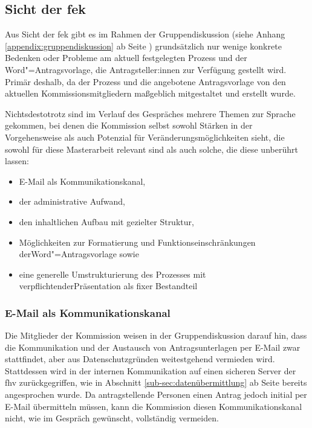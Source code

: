 \documentclass[a4paper,12pt,twoside,numbers=noendperiod]{scrreprt}
\begin{document}
\subsection{Sicht der \acl{fek}}
\label{sub-sec:probleme-sicht-fek}

Aus Sicht der \acl{fek} gibt es im Rahmen der Gruppendiskussion (siehe Anhang \ref{appendix:gruppendiskussion} ab Seite \pageref{appendix:gruppendiskussion}) grundsätzlich nur wenige konkrete Bedenken oder Probleme am aktuell festgelegten Prozess und der Word"=Antragsvorlage, die Antragsteller:innen zur Verfügung gestellt wird. Primär deshalb, da der Prozess und die angebotene Antragsvorlage von den aktuellen Kommissionsmitgliedern maßgeblich mitgestaltet und erstellt wurde.

Nichtsdestotrotz sind im Verlauf des Gespräches mehrere Themen zur Sprache gekommen, bei denen die Kommission selbst sowohl Stärken in der Vorgehensweise als auch Potenzial für Veränderungsmöglichkeiten sieht, die sowohl für diese Masterarbeit relevant sind als auch solche, die diese unberührt lassen:
\begin{itemize}
    \item E-Mail als Kommunikationskanal,
    \item der administrative Aufwand,
    \item den inhaltlichen Aufbau mit gezielter Struktur,
    \item Möglichkeiten zur Formatierung und Funktionseinschränkungen der\newline Word"=Antragsvorlage sowie
    \item eine generelle Umstrukturierung des Prozesses mit verpflichtender\newline Präsentation als fixer Bestandteil
\end{itemize}

\subsubsection*{E-Mail als Kommunikationskanal}
\label{sub-sub-sec:email-kommunikationskanal}

Die Mitglieder der Kommission weisen in der Gruppendiskussion darauf hin, dass die Kommunikation und der Austausch von Antragsunterlagen per E-Mail zwar stattfindet, aber aus Datenschutzgründen weitestgehend vermieden wird. Stattdessen wird in der internen Kommunikation auf einen sicheren Server der \acl{fhv} zurückgegriffen, wie in Abschnitt \ref{sub-sec:datenübermittlung} ab Seite \pageref{sub-sec:datenübermittlung} bereits angesprochen wurde. Da antragstellende Personen einen Antrag jedoch initial per E-Mail übermitteln müssen, kann die Kommission diesen Kommunikationskanal nicht, wie im Gespräch gewünscht, vollständig vermeiden.
\end{document}

